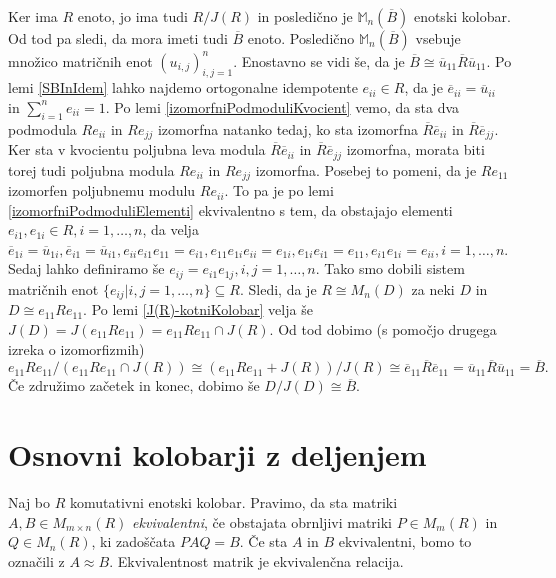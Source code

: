 \documentclass[a4paper, 12pt]{amsart}
\theoremstyle{definition} %
\theoremstyle{plain} %
\newcommand{\M}{\mathbb M}
\begin{document}
\proof
Ker ima $R$ enoto, jo ima tudi $R/J(R)$ in posledično je $\M_n(\overline{B})$ enotski kolobar. Od tod pa sledi, da mora imeti tudi $\overline{B}$ enoto. Posledično $\M_n(\overline{B})$ vsebuje množico matričnih enot $(u_{i,j})_{i,j=1}^n$. Enostavno se vidi še, da je $\overline{B}\cong \overline{u}_{11}\overline{R} \overline{u}_{11} $. Po lemi \ref{SBInIdem} lahko najdemo ortogonalne idempotente $e_{ii} \in R$, da je $\overline{e}_{ii} = \overline{u}_{ii}$ in $\sum_{i=1}^n e_{ii} = 1$. Po lemi \ref{izomorfniPodmoduliKvocient} vemo, da sta dva podmodula $Re_{ii}$ in $Re_{jj}$ izomorfna natanko tedaj, ko sta izomorfna $\overline{R} \overline{e}_{ii}$ in $\overline{R}\overline{e}_{jj}$. Ker sta v kvocientu poljubna leva modula $\overline{R} \overline{e}_{ii}$ in $\overline{R}\overline{e}_{jj}$ izomorfna, morata biti torej tudi poljubna modula $Re_{ii}$ in $Re_{jj}$ izomorfna. Posebej to pomeni, da je $Re_{11}$ izomorfen poljubnemu modulu $Re_{ii}$. To pa je po lemi \ref{izomorfniPodmoduliElementi} ekvivalentno s tem, da obstajajo elementi $e_{i1}, e_{1i}\in R, i=1,\dots,n$, da velja $\overline{e}_{1i} = \overline{u}_{1i}, \overline{e}_{i1} = \overline{u}_{i1}, e_{ii}e_{i1}e_{11} = e_{i1}, e_{11} e_{1i}e_{ii} = e_{1i}, e_{1i} e_{i1} = e_{11}, e_{i1} e_{1i} = e_{ii}, i = 1,\dots,n$. Sedaj lahko definiramo še $e_{ij} = e_{i1}e_{1j}, i, j = 1,\dots,n$. Tako smo dobili sistem matričnih enot $\{ e_{ij}|i,j=1,\dots,n\} \subseteq R$. Sledi, da je $R\cong M_n(D)$ za neki $D$ in $D\cong e_{11} R e_{11}$. Po lemi \ref{J(R)-kotniKolobar} velja še $J(D) = J(e_{11} R e_{11}) = e_{11} R e_{11} \cap J(R)$. Od tod dobimo (s pomočjo drugega izreka o izomorfizmih)
$$
e_{11}Re_{11} / (e_{11} R e_{11} \cap J(R)) \cong (e_{11} R e_{11} + J(R))/J(R) \cong \overline{e}_{11} \overline{R} \overline{e}_{11} = \overline{u}_{11} \overline{R} \overline{u}_{11} = \overline{B}.
$$
Če združimo začetek in konec, dobimo še $D/J(D) \cong \overline{B}$.
\endproof

\section{Osnovni kolobarji z deljenjem}

Naj bo $R$ komutativni enotski kolobar. Pravimo, da sta matriki $A,B\in M_{m\times n} (R)$ \emph{ekvivalentni}, če obstajata obrnljivi matriki $P\in M_m(R)$ in $Q\in M_n(R)$, ki zadoščata $PAQ = B$. Če sta $A$ in $B$ ekvivalentni, bomo to označili z $A \approx B$. Ekvivalentnost matrik je ekvivalenčna relacija.
\end{document}
